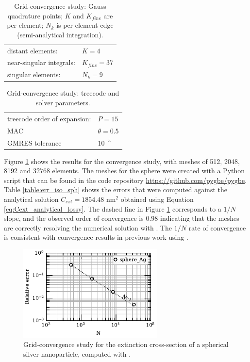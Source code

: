 \begin{table}[h]
    \centering
    \caption{\label{table:quadparams1} Grid-convergence study: Gauss quadrature points; 
    $K$ and $K_{fine}$ are per element; $N_k $ is per element edge (semi-analytical integration). } 
    \begin{tabular}{l l}
    \hline%
     distant elements: & $K=4$ \\
     near-singular integrals:   & $ K_{fine}=37$ \\
     singular elements:  & $N_k =9$ \\
    \hline%
    \end{tabular}
\end{table}
%
\begin{table}[h]
    \centering
    \caption{\label{table:treeparams1} Grid-convergence study: treecode and solver parameters.} 
    \begin{tabular}{l l}
    \hline%
    treecode order of expansion: & $P=15$\\
    MAC                          & $\theta=0.5$\\
    GMRES tolerance                    & $10^{-5}$\\
    \hline%
    \end{tabular}
\end{table}
%
Figure \ref{fig:conv_iso_sph} shows the results for the convergence study, with meshes of 512, 2048, 
8192 and 32768 elements. The meshes for the sphere were created with a Python script that can be found in the
code repository \url{https://github.com/pygbe/pygbe}. Table \ref{table:err_iso_sph} shows the errors that were computed against
the analytical solution $C_{ext} = 1854.48$ nm$^2$ obtained using Equation \eqref{eq:Cext_analytical_lossy}.
The dashed line in Figure \ref{fig:conv_iso_sph} corresponds to a $1/N$ slope, and the observed order of 
convergence is $0.98$ indicating that the meshes are correctly resolving the numerical solution with \pygbe.
The $1/N$ rate of convergence is consistent with convergence results in
previous work using \pygbe \cite{CooperBardhanBarba2013}. 

\begin{figure}%
    \centering
    \includegraphics[width=0.65\textwidth]{convergence_sph_Ag_R8_w380.pdf} 
    \caption{Grid-convergence study for the extinction cross-section of a spherical silver
             nanoparticle, computed with \pygbe.}
    \label{fig:conv_iso_sph}
 \end{figure}
 
